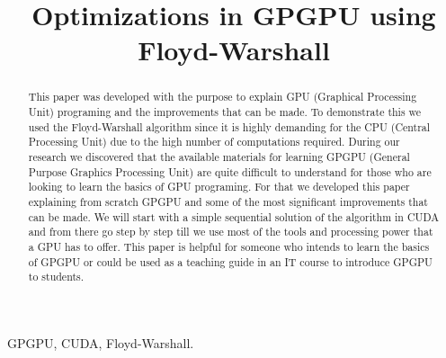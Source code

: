 \documentclass[conference]{IEEEtran}
\begin{document}
\title{Optimizations in GPGPU using Floyd-Warshall}


\author{
\and
{}
}

\maketitle

\begin{abstract}
This paper was developed with the purpose to explain GPU (Graphical Processing Unit) programing and the improvements that can be made. To demonstrate this we used the Floyd-Warshall algorithm since it is highly demanding for the CPU (Central Processing Unit) due to the high number of computations required. During our research we discovered that the available materials for learning GPGPU (General Purpose Graphics Processing Unit) are quite difficult to understand for those who are looking to learn the basics of GPU programing. For that we developed this paper explaining from scratch GPGPU and some of the most significant improvements that can be made. We will start with a simple sequential solution of the algorithm in CUDA and from there go step by step till we use most of the tools and processing power that a GPU has to offer. This paper is helpful for someone who intends to learn the basics of GPGPU or could be used as a teaching guide in an IT course to introduce GPGPU to students.
\end{abstract}

\begin{IEEEkeywords}
GPGPU, CUDA, Floyd-Warshall.
\end{IEEEkeywords}
\end{document}
